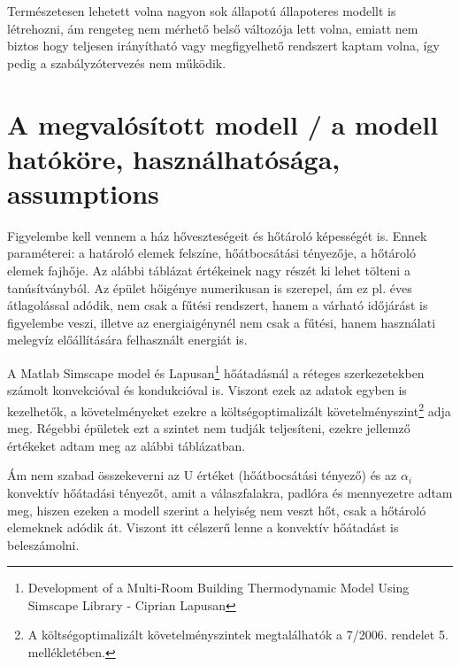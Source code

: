 Természetesen lehetett volna nagyon sok állapotú állapoteres modellt is létrehozni, ám rengeteg nem mérhető belső változója lett volna, emiatt nem biztos hogy teljesen irányítható vagy megfigyelhető rendszert kaptam volna, így pedig a szabályzótervezés nem működik.





\section{A megvalósított modell / a modell hatóköre, használhatósága, assumptions}

Figyelembe kell vennem a ház hőveszteségeit és hőtároló képességét is.
Ennek paraméterei: a határoló elemek felszíne, hőátbocsátási tényezője, a hőtároló elemek fajhője. Az alábbi táblázat értékeinek nagy részét ki lehet tölteni a tanúsítványból.
Az épület hőigénye numerikusan is szerepel, ám ez pl. éves átlagolással adódik, nem csak a fűtési rendszert, hanem a várható időjárást is figyelembe veszi, illetve az energiaigénynél nem csak a fűtési, hanem használati melegvíz előállítására felhasznált energiát is.

A Matlab Simscape model és Lapusan\footnote{Development of a Multi-Room Building Thermodynamic Model Using Simscape Library - Ciprian Lapusan} hőátadásnál a réteges szerkezetekben számolt konvekcióval és kondukcióval is. Viszont ezek az adatok egyben is kezelhetők, a követelményeket ezekre a költségoptimalizált követelményszint\footnote{ A  költségoptimalizált követelményszintek megtalálhatók a 7/2006. rendelet \cite{TNM2006} 5. mellékletében.} adja meg. Régebbi épületek ezt a szintet nem tudják teljesíteni, ezekre jellemző értékeket adtam meg az alábbi táblázatban. 


Ám nem szabad összekeverni az U értéket (hőátbocsátási tényező) és az $\alpha_i$ konvektív hőátadási tényezőt, amit a válaszfalakra, padlóra és mennyezetre adtam meg, hiszen ezeken a modell szerint a helyiség nem veszt hőt, csak a hőtároló elemeknek adódik át. Viszont itt célszerű lenne a konvektív hőátadást is beleszámolni. 



\begin{table}[H]
	\centering
	
	\renewcommand{\arraystretch}{2} %
	
	
	
	
	\caption{Egy szoba határoló felületei és azok termikus tulajdonságai}
	\label{table_house_parameters}
\end{table}


